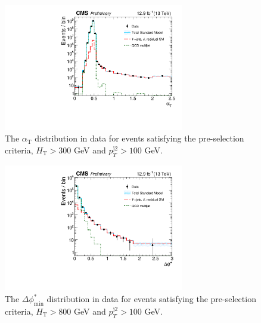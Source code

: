 \maketitle



\clearpage
\begin{figure}[tbhp]
    \caption{ 
    The $\alpha_{\mathrm{T}}$ distribution in data for events satisfying the pre-selection criteria, $H_{\mathrm{T}} > 300$ GeV and $p_{T}^{\mathrm{j2}} > 100$ GeV. 
    \label{fig:alphaT} }
  \begin{center}
  \includegraphics[width=0.7\textwidth]{alphaT_aux}
  \end{center}
\end{figure}


\begin{figure}[tbhp]
    \caption{ 
    The $\Delta\phi^{*}_{\mathrm{min}}$ distribution in data for events satisfying the pre-selection criteria, $H_{\mathrm{T}} > 800$ GeV and $p_{T}^{\mathrm{j2}} > 100$ GeV. 
    \label{fig:bDPhi} }
  \begin{center}
  \includegraphics[width=0.7\textwidth]{bDPhi_aux}
  \end{center}
\end{figure}

